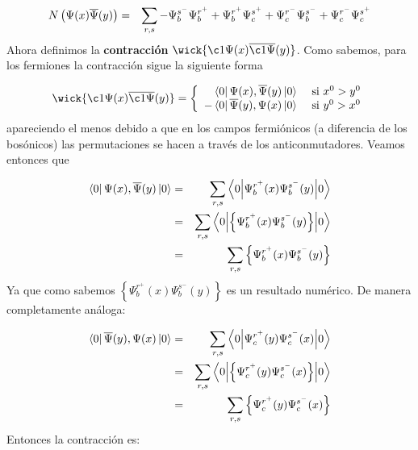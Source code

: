 \begin{solucion}
	\begin{eqnarray*}
		N\left( \Psi(x)\overline{\Psi}(y) \right) & = & \sum_{r,s} - \Psi_b^{s^-} \Psi_b^{r^+}  +  \Psi_b^{r^+}\Psi_c^{s^+} + \Psi_c^{r^-} \Psi_b^{s^-} + \Psi_c^{r^-}\Psi_c^{s^+}
	\end{eqnarray*}
	Ahora definimos la \textbf{contracción} $\wick{\c1{\Psi}(x)\overline{\c1{\Psi}}(y)}$. Como sabemos, para los fermiones la contracción sigue la siguiente forma
	
	\begin{equation*}
		 \wick{\c1{\Psi}(x)\overline{\c1{\Psi}}(y)} =\left\lbrace  \begin{array}{rl}
		  \bra{0} \Psi (x), \aPsi (y) \ket{0} & \ \text{si} \ x^0>y^0 \\
		 	- \bra{0} \aPsi (y), \Psi (x)\ket{0} & \ \text{si} \ y^0>x^0 \\
		 \end{array} \right.
	\end{equation*}
	apareciendo el menos debido a que en los campos fermiónicos (a diferencia de los bosónicos) las permutaciones se hacen a través de los anticonmutadores. Veamos entonces que 
	
	\begin{eqnarray*}
		\bra{0} \Psi (x), \aPsi (y) \ket{0}& = & \sum_{r,s} \ev**{  \Psi_b^{r^+} (x) \Psi_b^{s^-} (y) }{0} \\ & = & \sum_{r,s} \ev**{ \left\lbrace \Psi_b^{r^+} (x) \Psi_b^{s^-} (y) \right\rbrace  }{0} \\ & = &\sum_{r,s} \left\lbrace \Psi_b^{r^+} (x) \Psi_b^{s^-} (y) \right\rbrace 
	\end{eqnarray*}
	Ya que como sabemos $\left\lbrace \Psi_b^{r^+} (x) \Psi_b^{s^-} (y) \right\rbrace$ es un resultado numérico. De manera completamente análoga:
	
	\begin{eqnarray*}
		\bra{0} \aPsi (y), \Psi (x) \ket{0}& = & \sum_{r,s} \ev**{  \Psi_c^{r^+} (y) \Psi_c^{s^-} (x) }{0} \\ & = & \sum_{r,s} \ev**{ \left\lbrace \Psi_c^{r^+} (y) \Psi_c^{s^-} (x) \right\rbrace  }{0} \\ & = &\sum_{r,s} \left\lbrace \Psi_c^{r^+} (y) \Psi_c^{s^-} (x) \right\rbrace 
	\end{eqnarray*}	
	Entonces la contracción es:
	

\end{solucion}
